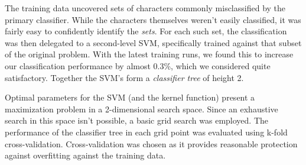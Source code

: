 \documentclass{netsec2012}
\begin{document}
The training data uncovered sets of characters commonly misclassified by the primary classifier.
While the characters themselves weren't easily classified, it was fairly easy to confidently identify
the \emph{sets}.  For each such set, the classification was then delegated to a second-level SVM, specifically
trained against that subset of the original problem.  With the latest training runs, we found this to
increase our classification performance by almost 0.3\%, which we considered quite satisfactory.
Together the SVM's form a \emph{classifier tree} of height 2.

Optimal parameters for the SVM (and the kernel function) present a maximization problem in a
2-dimensional search space.  Since an exhaustive search in this space isn't possible,
a basic grid search was employed.  The performance of the classifier tree in each grid point
was evaluated using k-fold cross-validation.  Cross-validation was chosen as it provides
reasonable protection against overfitting against the training data.

\end{document}
